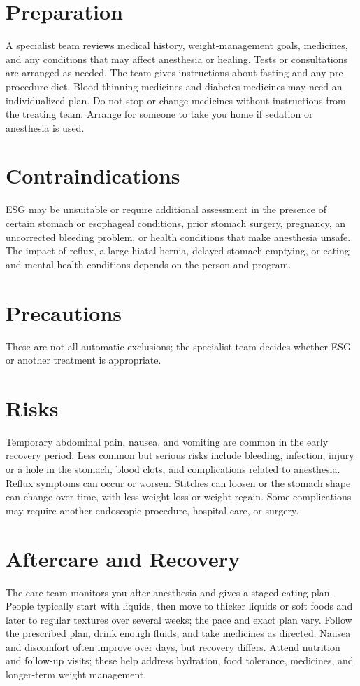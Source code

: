 \section*{Preparation}
A specialist team reviews medical history, weight-management goals, medicines, and any conditions that may affect anesthesia or healing. Tests or consultations are arranged as needed. The team gives instructions about fasting and any pre-procedure diet. Blood-thinning medicines and diabetes medicines may need an individualized plan. Do not stop or change medicines without instructions from the treating team. Arrange for someone to take you home if sedation or anesthesia is used.

\section*{Contraindications}
ESG may be unsuitable or require additional assessment in the presence of certain stomach or esophageal conditions, prior stomach surgery, pregnancy, an uncorrected bleeding problem, or health conditions that make anesthesia unsafe. The impact of reflux, a large hiatal hernia, delayed stomach emptying, or eating and mental health conditions depends on the person and program.

\section*{Precautions}
These are not all automatic exclusions; the specialist team decides whether ESG or another treatment is appropriate.

\section*{Risks}
Temporary abdominal pain, nausea, and vomiting are common in the early recovery period. Less common but serious risks include bleeding, infection, injury or a hole in the stomach, blood clots, and complications related to anesthesia. Reflux symptoms can occur or worsen. Stitches can loosen or the stomach shape can change over time, with less weight loss or weight regain. Some complications may require another endoscopic procedure, hospital care, or surgery.

\section*{Aftercare and Recovery}
The care team monitors you after anesthesia and gives a staged eating plan. People typically start with liquids, then move to thicker liquids or soft foods and later to regular textures over several weeks; the pace and exact plan vary. Follow the prescribed plan, drink enough fluids, and take medicines as directed. Nausea and discomfort often improve over days, but recovery differs. Attend nutrition and follow-up visits; these help address hydration, food tolerance, medicines, and longer-term weight management.

